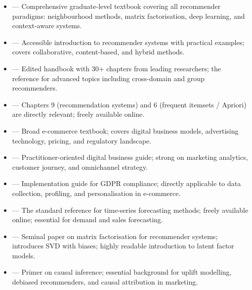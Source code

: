 \begin{itemize}
    \item {} --- Comprehensive graduate-level textbook covering all recommender paradigms: neighbourhood methods, matrix factorisation, deep learning, and context-aware systems.
    \item {} --- Accessible introduction to recommender systems with practical examples; covers collaborative, content-based, and hybrid methods.
    \item {} --- Edited handbook with 30+ chapters from leading researchers; the reference for advanced topics including cross-domain and group recommenders.
    \item {} --- Chapters 9 (recommendation systems) and 6 (frequent itemsets / Apriori) are directly relevant; freely available online.
    \item {} --- Broad e-commerce textbook; covers digital business models, advertising technology, pricing, and regulatory landscape.
    \item {} --- Practitioner-oriented digital business guide; strong on marketing analytics, customer journey, and omnichannel strategy.
    \item {} --- Implementation guide for GDPR compliance; directly applicable to data collection, profiling, and personalisation in e-commerce.
    \item {} --- The standard reference for time-series forecasting methods; freely available online; essential for demand and sales forecasting.
    \item {} --- Seminal paper on matrix factorisation for recommender systems; introduces SVD with biases; highly readable introduction to latent factor models.
    \item {} --- Primer on causal inference; essential background for uplift modelling, debiased recommenders, and causal attribution in marketing.
\end{itemize}

